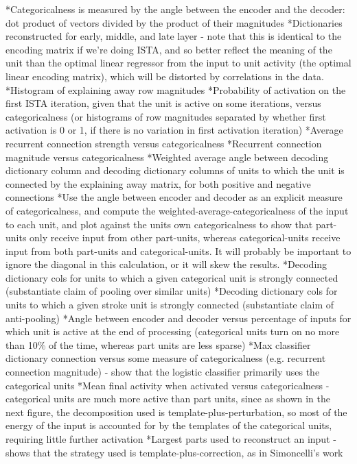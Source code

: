 *Categoricalness is measured by the angle between the encoder and the decoder: dot product of vectors divided by the product of their magnitudes
*Dictionaries reconstructed for early, middle, and late layer - note that this is identical to the encoding matrix if we're doing ISTA, and so better reflect the meaning of the unit than the optimal linear regressor from the input to unit activity (the optimal linear encoding matrix), which will be distorted by correlations in the data.
*Histogram of explaining away row magnitudes
*Probability of activation on the first ISTA iteration, given that the unit is active on some iterations, versus categoricalness (or histograms of row magnitudes separated by whether first activation is 0 or 1, if there is no variation in first activation iteration)
*Average recurrent connection strength versus categoricalness
*Recurrent connection magnitude versus categoricalness
*Weighted average angle between decoding dictionary column and decoding dictionary columns of units to which the unit is connected by the explaining away matrix, for both positive and negative connections
*Use the angle between encoder and decoder as an explicit measure of categoricalness, and compute the weighted-average-categoricalness of the input to each unit, and plot against the units own categoricalness to show that part-units only receive input from other part-units, whereas categorical-units receive input from both part-units and categorical-units.  It will probably be important to ignore the diagonal in this calculation, or it will skew the results.
*Decoding dictionary cols for units to which a given categorical unit is strongly connected (substantiate claim of pooling over similar units)
*Decoding dictionary cols for units to which a given stroke unit is strongly connected (substantiate claim of anti-pooling)
*Angle between encoder and decoder versus percentage of inputs for which unit is active at the end of processing (categorical units turn on no more than 10\% of the time, whereas part units are less sparse)
*Max classifier dictionary connection versus some measure of categoricalness (e.g. recurrent connection magnitude) - show that the logistic classifier primarily uses the categorical units
*Mean final activity when activated versus categoricalness - categorical units are much more active than part units, since as shown in the next figure, the decomposition used is template-plus-perturbation, so most of the energy of the input is accounted for by the templates of the categorical units, requiring little further activation
*Largest parts used to reconstruct an input - shows that the strategy used is template-plus-correction, as in Simoncelli's work
